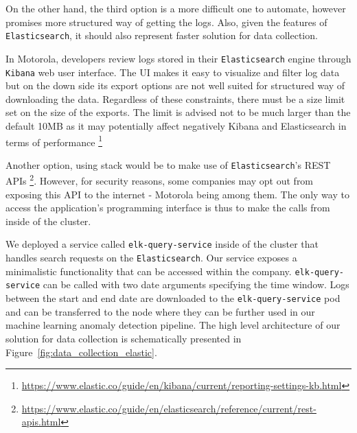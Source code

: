 On the other hand, the third option is a more difficult one to automate, however promises more structured way of getting the logs. Also, given the features of \texttt{Elasticsearch}, it should also represent faster solution for data collection.

In Motorola, developers review logs stored in their \texttt{Elasticsearch} engine through \texttt{Kibana} web user interface. The UI makes it easy to visualize and filter log data but on the down side its export options are not well suited for structured way of downloading the data. Regardless of these constraints, there must be a size limit set on the size of the exports. The limit is advised not to be much larger than the default 10MB as it may potentially affect negatively Kibana and Elasticsearch in terms of performance \footnote{\url{https://www.elastic.co/guide/en/kibana/current/reporting-settings-kb.html}}

Another option, using  stack would be to make use of \texttt{Elasticsearch}'s REST APIs \footnote{\url{https://www.elastic.co/guide/en/elasticsearch/reference/current/rest-apis.html}}. However, for security reasons, some companies may opt out from exposing this API to the internet - Motorola being among them.
The only way to access the application's programming interface is thus to make the calls from inside of the cluster.

We deployed a service called \texttt{elk-query-service} inside of the cluster that handles search requests on the \texttt{Elasticsearch}. Our service exposes a minimalistic functionality that can be accessed within the company.
\texttt{elk-query-service} can be called with two date arguments specifying the time window. Logs between the start and end date are downloaded to the \texttt{elk-query-service} pod and can be transferred to the node where they can be further used in our machine learning anomaly detection pipeline. The high level architecture of our solution for data collection is schematically presented in Figure~\ref{fig:data_collection_elastic}.

